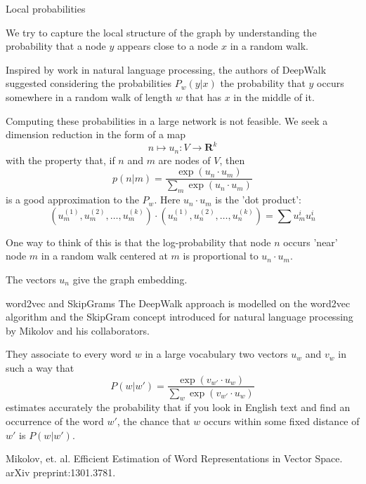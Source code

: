 \documentclass{beamer}
\begin{document}
\begin{frame}{Local probabilities}

  We try to capture the local structure of the graph by understanding the probability that a node $y$ appears close to a node $x$ in a random walk.

  \bigskip\noindent
  Inspired by work in natural language processing, the authors of DeepWalk suggested considering the probabilities
  $P_{w}(y|x)$   the probability that $y$ occurs somewhere in a random walk of length $w$ that has $x$ in the middle of  it.

\end{frame}
\begin{frame}

  Computing these probabilities in a large network is not feasible. We seek a dimension reduction
  in the form of a map $$n\mapsto u_n:V\to \mathbf{R}^{k}$$
  with the property that, if $n$ and $m$ are nodes of $V$, then 
  $$
  p(n|m)=\frac{\exp(u_n\cdot u_m)}{\sum_{m} \exp(u_n\cdot u_m)}
  $$
  is a good approximation to the $P_{w}$. Here $u_n\cdot u_m$ is the 'dot product':
  $$
  (u_m^{(1)},u_m^{(2)},\ldots,u_m^{(k)})\cdot (u_n^{(1)},u_n^{(2)},\ldots,u_n^{(k)})=\sum u_{m}^{i}u_{n}^{i}
  $$
  
  One way to think of this is that the log-probability that node $n$ occurs 'near' node $m$ in a random walk
  centered at $m$ is proportional to $u_n\cdot u_m$.  

  The vectors $u_n$ give the graph embedding.

\end{frame}
\begin{frame}{word2vec and SkipGrams}
  The DeepWalk approach is modelled on the word2vec algorithm and the SkipGram concept introduced for natural language processing by Mikolov and his collaborators.

  They associate to every word $w$ in a large vocabulary two vectors $u_w$ and $v_w$ in such a way
  that
  $$
  P(w|w')=\frac{\exp(v_{w'}\cdot u_w)}{\sum_{w} \exp (v_{w'}\cdot u_w)}
  $$
  estimates accurately the probability that if you look in English text and find an occurrence of the word $w'$,
  the chance that $w$ occurs within some fixed distance of $w'$ is $P(w|w')$.
  
  \begin{block}{}
    \tiny{
      Mikolov, et. al. Efficient Estimation of Word Representations in Vector Space. arXiv preprint:1301.3781.
    }
  \end{block}
\end{frame}
\end{document}
